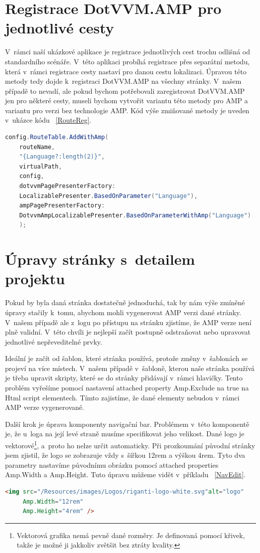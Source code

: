 \section{Registrace DotVVM.AMP pro jednotlivé cesty}
V~rámci naší ukázkové aplikace je registrace jednotlivých cest trochu odlišná od standardního scénáře. V~této aplikaci probíhá registrace přes separátní metodu, která v~rámci registrace cesty nastaví pro danou cestu lokalizaci. Úpravou této metody tedy dojde k~registraci DotVVM.AMP na všechny stránky. V~našem případě to nevadí, ale pokud bychom potřebovali zaregistrovat DotVVM.AMP jen pro některé cesty, museli bychom vytvořit variantu této metody pro AMP a variantu pro verzi bez technologie AMP. Kód výše zmiňované metody je uveden v~ukázce kódu ~\ref{RouteReg}. 
\begin{lstlisting}[language=c#, caption=Registrace cesty s~DotVVM.AMP,label=RouteReg,captionpos=t]
config.RouteTable.AddWithAmp(
	routeName,
	"{Language?:length(2)}",
	virtualPath,
	config,
	dotvvmPagePresenterFactory:
	LocalizablePresenter.BasedOnParameter("Language"),
	ampPagePresenterFactory:
	DotvvmAmpLocalizablePresenter.BasedOnParameterWithAmp("Language")
	);

\end{lstlisting}

\section{Úpravy stránky s~detailem projektu}
Pokud by byla daná stránka dostatečně jednoduchá, tak by nám výše zmíněné úpravy stačily k~tomu, abychom mohli vygenerovat AMP verzi dané stránky. V~našem případě ale z~logu po přístupu na stránku zjistíme, že AMP verze není plně validní. V~této chvíli je nejlepší začít postupně odstraňovat nebo upravovat jednotlivé nepřeveditelné prvky.

Ideální je začít od šablon, které stránka používá, protože změny v~šablonách se projeví na více místech. V~našem případě v~šabloně, kterou naše stránka používá je třeba upravit skripty, které se do stránky přidávají v~rámci hlavičky. Tento problém vyřešíme pomocí nastavení attached property Amp.Exclude na true na Html script elementech. Tímto zajistíme, že dané elementy nebudou v~rámci AMP verze vygenerované.

Další krok je úprava komponenty navigační bar. Problémem v~této komponentě je, že u~loga na její levé straně musíme specifikovat jeho velikost. Dané logo je vektorové\footnote{Vektorová grafika nemá pevně dané rozměry. Je definovaná pomocí křivek, takže je možné ji jakkoliv zvětšit bez ztráty kvality.}, a~proto ho nelze určit automaticky. Při prozkoumání původní stránky jsem zjistil, že logo se zobrazuje vždy s~šířkou 12rem a výškou 4rem. Tyto dva parametry nastavíme původnímu obrázku pomocí attached properties Amp.Width a Amp.Height. Tuto úpravu můžeme vidět v~příkladu ~\ref{NavEdit}.
\begin{lstlisting}[language=html, caption=Upřesnění velikosti obrázku.,label=NavEdit,captionpos=t]
<img src="/Resources/images/Logos/riganti-logo-white.svg"alt="logo"
     Amp.Width="12rem"
     Amp.Height="4rem" />
\end{lstlisting}

